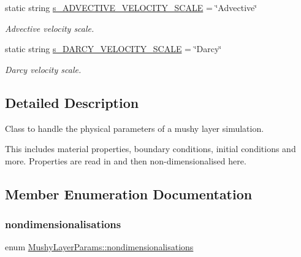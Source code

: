 \begin{DoxyCompactItemize}
\mbox{\label{class_mushy_layer_params_a63da4997934ff9382613b0a06a186d51}} 
static string \hyperlink{class_mushy_layer_params_a63da4997934ff9382613b0a06a186d51}{s\+\_\+\+A\+D\+V\+E\+C\+T\+I\+V\+E\+\_\+\+V\+E\+L\+O\+C\+I\+T\+Y\+\_\+\+S\+C\+A\+LE} = \char`\"{}Advective\char`\"{}
\begin{DoxyCompactList}\small\item\em Advective velocity scale. \end{DoxyCompactList}\item 
\mbox{\label{class_mushy_layer_params_a3eb0c2ebf0a11c519d8e2a853670c1f2}} 
static string \hyperlink{class_mushy_layer_params_a3eb0c2ebf0a11c519d8e2a853670c1f2}{s\+\_\+\+D\+A\+R\+C\+Y\+\_\+\+V\+E\+L\+O\+C\+I\+T\+Y\+\_\+\+S\+C\+A\+LE} = \char`\"{}Darcy\char`\"{}
\begin{DoxyCompactList}\small\item\em Darcy velocity scale. \end{DoxyCompactList}\end{DoxyCompactItemize}


\subsection{Detailed Description}
Class to handle the physical parameters of a mushy layer simulation. 

This includes material properties, boundary conditions, initial conditions and more. Properties are read in and then non-\/dimensionalised here. 

\subsection{Member Enumeration Documentation}
\mbox{\label{class_mushy_layer_params_a9de94ba9465c51de9b37fc946622bee8}} 
\subsubsection{\texorpdfstring{nondimensionalisations}{nondimensionalisations}}
{\footnotesize\ttfamily enum \hyperlink{class_mushy_layer_params_a9de94ba9465c51de9b37fc946622bee8}{Mushy\+Layer\+Params\+::nondimensionalisations}}



